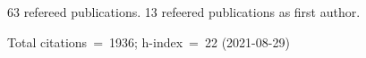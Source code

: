 63 refereed publications. 13 refeered publications as first author.

Total citations~=~1936; h-index~=~22 (2021-08-29)